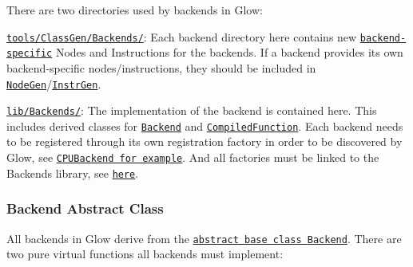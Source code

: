 There are two directories used by backends in Glow\+:


\begin{DoxyEnumerate}
\item \href{https://github.com/pytorch/glow/tree/master/tools/ClassGen/Backends}{\tt tools/\+Class\+Gen/\+Backends/}\+: Each backend directory here contains new \href{#backend-specific-nodes-and-instructions-transformations}{\tt backend-\/specific} Nodes and Instructions for the backends. If a backend provides its own backend-\/specific nodes/instructions, they should be included in \href{https://github.com/pytorch/glow/blob/master/tools/ClassGen/NodeGen.cpp}{\tt Node\+Gen}/\href{https://github.com/pytorch/glow/blob/master/tools/ClassGen/InstrGen.cpp}{\tt Instr\+Gen}.
\item \href{https://github.com/pytorch/glow/tree/master/lib/Backends}{\tt lib/\+Backends/}\+: The implementation of the backend is contained here. This includes derived classes for \href{#backend-abstract-class}{\tt {\ttfamily Backend}} and \href{#compiledfunction-abstract-class}{\tt {\ttfamily Compiled\+Function}}. Each backend needs to be registered through its own registration factory in order to be discovered by Glow, see \href{https://github.com/pytorch/glow/blob/master/lib/Backends/CPU/CPUFactory.cpp}{\tt C\+P\+U\+Backend for example}. And all factories must be linked to the Backends library, see \href{https://github.com/pytorch/glow/blob/master/lib/Backends/CMakeLists.txt}{\tt here}.
\end{DoxyEnumerate}

\subsubsection*{{\ttfamily Backend} Abstract Class}

All backends in Glow derive from the \href{https://github.com/pytorch/glow/blob/master/include/glow/Backends/Backend.h}{\tt abstract base class {\ttfamily Backend}}. There are two pure virtual functions all backends must implement\+:


